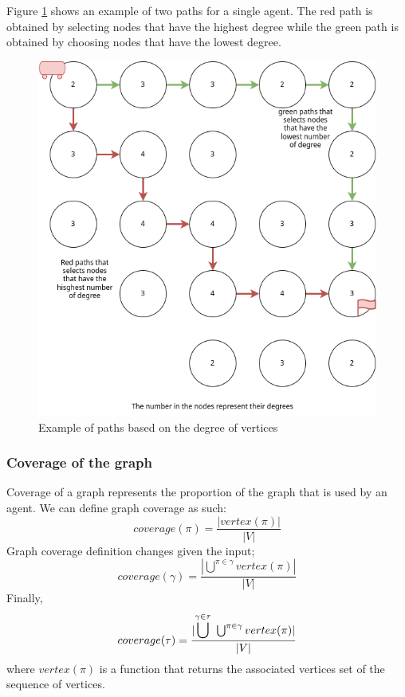 Figure \ref{img:criteria_degree} shows an example of two paths for a single agent. The red path is obtained by selecting nodes that have the highest degree while the green path is obtained by choosing nodes that have the lowest degree.   
\begin{figure}[H]
  \centering
  \caption{Example of paths based on the degree of vertices}\label{img:criteria_degree}
  \includegraphics[width=\widthimg]{img/criteria_degree.drawio.png}
\end{figure}


\subsubsection{Coverage of the graph}\label{sec:graph_coverage}

Coverage of a graph represents the proportion of the graph that is used by an agent. We can define graph coverage as such: \[
  coverage(\pi) = \frac{|vertex(\pi)|}{|V|}
\] Graph coverage definition changes given the input; \[
  coverage(\gamma) = \frac{| \bigcup^{\pi \in \gamma} vertex(\pi) |} {|V|}
\] Finally, \[
  coverage(\tau) = \frac{| \mathlarger{\mathlarger{\bigcup}}^{\gamma \in \tau}{ \text{  } \bigcup^{\pi \in \gamma}{vertex(\pi)}} |} {|V|}
\] where \(vertex(\pi)\) is a function that returns the associated vertices set of the sequence of vertices.


